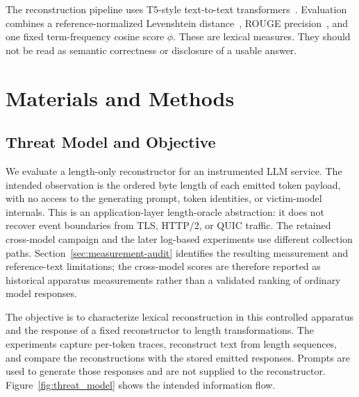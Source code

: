 \documentclass[electronics,article,submit,pdftex,moreauthors]{Definitions/mdpi}
\begin{document}
The reconstruction pipeline uses T5-style text-to-text transformers~\cite{raffel2020exploring}. Evaluation combines a reference-normalized Levenshtein distance~\cite{levenshtein1966binary}, ROUGE precision~\cite{lin2004rouge}, and one fixed term-frequency cosine score $\phi$. These are lexical measures. They should not be read as semantic correctness or disclosure of a usable answer.

\section{Materials and Methods}
\subsection{Threat Model and Objective}
We evaluate a length-only reconstructor for an instrumented LLM service. The intended observation is the ordered byte length of each emitted token payload, with no access to the generating prompt, token identities, or victim-model internals. This is an application-layer length-oracle abstraction: it does not recover event boundaries from TLS, HTTP/2, or QUIC traffic. The retained cross-model campaign and the later log-based experiments use different collection paths. Section~\ref{sec:measurement-audit} identifies the resulting measurement and reference-text limitations; the cross-model scores are therefore reported as historical apparatus measurements rather than a validated ranking of ordinary model responses.

The objective is to characterize lexical reconstruction in this controlled apparatus and the response of a fixed reconstructor to length transformations. The experiments capture per-token traces, reconstruct text from length sequences, and compare the reconstructions with the stored emitted responses. Prompts are used to generate those responses and are not supplied to the reconstructor. Figure~\ref{fig:threat_model} shows the intended information flow.
\end{document}
